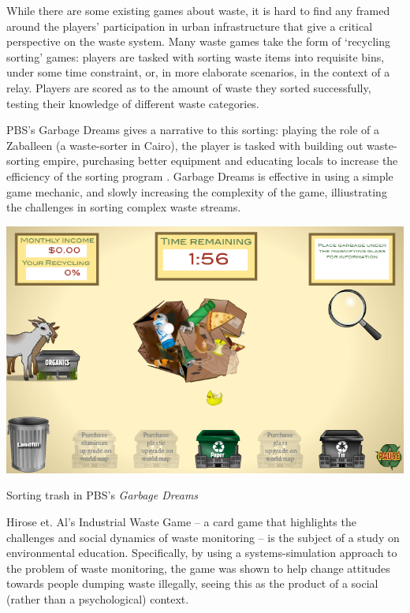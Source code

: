 \documentclass[nofonts,nols,justified,nobib]{tufte-book}
\begin{document}
While there are some existing games about waste, it is hard to find any framed around the players' participation in urban infrastructure that give a critical perspective on the waste system. Many waste games take the form of `recycling sorting' games: players are tasked with sorting waste items into requisite bins, under some time constraint, or, in more elaborate scenarios, in the context of a relay. Players are scored as to the amount of waste they sorted successfully, testing their knowledge of different waste categories. 

PBS's Garbage Dreams gives a narrative to this sorting: playing the role of a Zaballeen (a waste-sorter in Cairo), the player is tasked with building out waste-sorting empire, purchasing better equipment and educating locals to increase the efficiency of the sorting program \cite{iskander_garbage_2011}. Garbage Dreams is effective in using a simple game mechanic, and slowly increasing the complexity of the game, illiustrating the challenges in sorting complex waste streams. 


\begin{marginfigure}
\includegraphics[width=\textwidth]{img/1/garbage-dreams-1.png}
\caption{Sorting trash in PBS's \emph{Garbage Dreams} \cite{iskander_garbage_2011}}
\end{marginfigure}


Hirose et. Al's Industrial Waste Game \cite{hirose_industrial_2004} -- a card game that highlights the challenges and social dynamics of waste monitoring -- is the subject of a study on environmental education. Specifically, by using a systems-simulation approach to the problem of waste monitoring, the game was shown to help change attitudes towards people dumping waste illegally, seeing this as the product of a social (rather than a psychological) context. 
\end{document}
